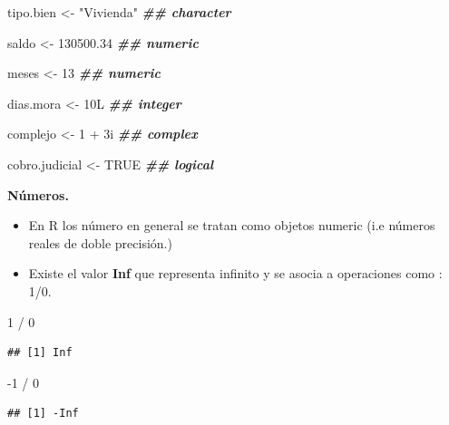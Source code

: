 \documentclass[
  12pt,
]{book}
\newenvironment{Shaded}{\begin{snugshade}}{\end{snugshade}}
\newcommand{\ConstantTok}[1]{\textcolor[rgb]{0.00,0.00,0.00}{#1}}
\newcommand{\DecValTok}[1]{\textcolor[rgb]{0.00,0.00,0.81}{#1}}
\newcommand{\DocumentationTok}[1]{\textcolor[rgb]{0.56,0.35,0.01}{\textbf{\textit{#1}}}}
\newcommand{\FloatTok}[1]{\textcolor[rgb]{0.00,0.00,0.81}{#1}}
\newcommand{\NormalTok}[1]{#1}
\newcommand{\OtherTok}[1]{\textcolor[rgb]{0.56,0.35,0.01}{#1}}
\newcommand{\SpecialCharTok}[1]{\textcolor[rgb]{0.00,0.00,0.00}{#1}}
\newcommand{\StringTok}[1]{\textcolor[rgb]{0.31,0.60,0.02}{#1}}
\providecommand{\tightlist}{%
  \setlength{\itemsep}{0pt}\setlength{\parskip}{0pt}}
\begin{document}
\begin{Shaded}
\begin{Highlighting}[]
\NormalTok{tipo.bien }\OtherTok{\textless{}{-}} \StringTok{"Vivienda"}   \DocumentationTok{\#\# character}

\NormalTok{saldo }\OtherTok{\textless{}{-}} \FloatTok{130500.34}        \DocumentationTok{\#\# numeric}

\NormalTok{meses }\OtherTok{\textless{}{-}} \DecValTok{13}               \DocumentationTok{\#\# numeric}

\NormalTok{dias.mora }\OtherTok{\textless{}{-}}\NormalTok{ 10L          }\DocumentationTok{\#\# integer}

\NormalTok{complejo }\OtherTok{\textless{}{-}} \DecValTok{1} \SpecialCharTok{+}\NormalTok{ 3i         }\DocumentationTok{\#\# complex}

\NormalTok{cobro.judicial }\OtherTok{\textless{}{-}} \ConstantTok{TRUE}    \DocumentationTok{\#\# logical}
\end{Highlighting}
\end{Shaded}

\textbf{Números.}

\begin{itemize}
\tightlist
\item
  En R los número en general se tratan como objetos numeric (i.e números reales de doble precisión.)
\item
  Existe el valor \textbf{Inf} que representa infinito y se asocia a operaciones como : 1/0.
\end{itemize}

\begin{Shaded}
\begin{Highlighting}[]
\DecValTok{1} \SpecialCharTok{/} \DecValTok{0}
\end{Highlighting}
\end{Shaded}

\begin{verbatim}
## [1] Inf
\end{verbatim}

\begin{Shaded}
\begin{Highlighting}[]
\SpecialCharTok{{-}}\DecValTok{1} \SpecialCharTok{/} \DecValTok{0}
\end{Highlighting}
\end{Shaded}

\begin{verbatim}
## [1] -Inf
\end{verbatim}
\end{document}
